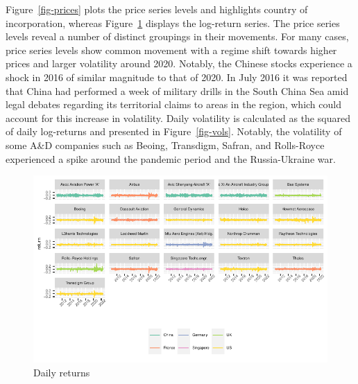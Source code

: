 \documentclass[
  number]{elsarticle}
\begin{document}
Figure~\ref{fig-prices} plots the price series levels and highlights
country of incorporation, whereas Figure~\ref{fig-rtns} displays the
log-return series. The price series levels reveal a number of distinct
groupings in their movements. For many cases, price series levels show
common movement with a regime shift towards higher prices and larger
volatility around 2020. Notably, the Chinese stocks experience a shock
in 2016 of similar magnitude to that of 2020. In July 2016 it was
reported that China had performed a week of military drills in the South
China Sea amid legal debates regarding its territorial claims to areas
in the region, which could account for this increase in volatility.
Daily volatility is calculated as the squared of daily log-returns and
presented in Figure~\ref{fig-vols}. Notably, the volatility of some A\&D
companies such as Beoing, Transdigm, Safran, and Rolls-Royce experienced
a spike around the pandemic period and the Russia-Ukraine war.

\begin{figure}[H]

{\centering \includegraphics{defence_files/figure-pdf/fig-rtns-1.pdf}

}

\caption{\label{fig-rtns}Daily returns}

\end{figure}
\end{document}
